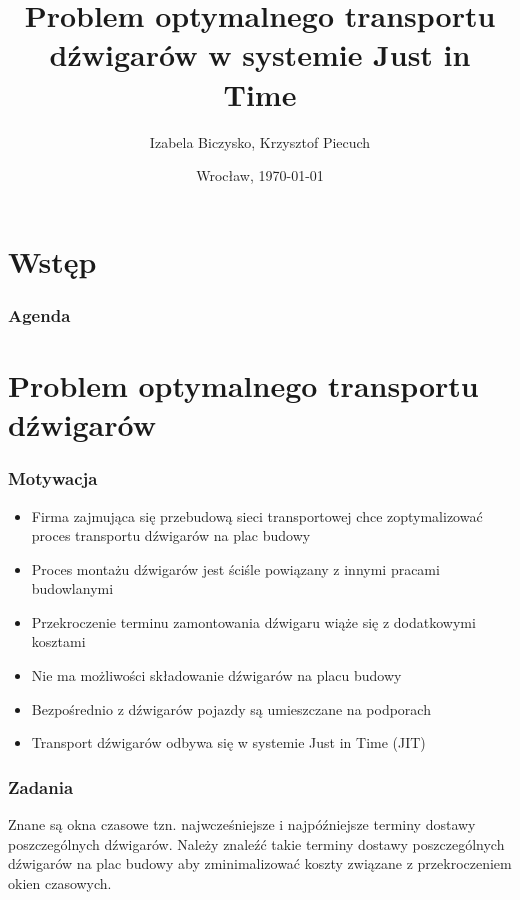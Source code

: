 \documentclass{beamer}
\title[Transport dźwigarów w systemie JIT]
{Problem optymalnego transportu dźwigarów w systemie Just in Time}
\author{Izabela Biczysko, Krzysztof Piecuch}
\institute[ii UWr]{Instytut Informatyki Uniwersytetu
Wrocławskiego}
\date{Wrocław, \today}
\begin{document}
 \maketitle



\section{Wstęp}
  \begin{frame}
  \frametitle{Agenda}
  \tableofcontents
  \end{frame}


 
 
 \section{Problem optymalnego transportu dźwigarów}
 \begin{frame}
  \frametitle{Motywacja}
  \begin{itemize}
   \item Firma zajmująca się przebudową sieci transportowej chce zoptymalizować proces transportu dźwigarów na plac budowy
   \item Proces montażu dźwigarów jest ściśle powiązany z innymi pracami budowlanymi
   \item Przekroczenie terminu zamontowania dźwigaru wiąże się z dodatkowymi kosztami
   \item Nie ma możliwości składowanie dźwigarów na placu budowy
   \item Bezpośrednio z dźwigarów pojazdy są umieszczane na podporach
   \item Transport dźwigarów odbywa się w systemie Just in Time (JIT)
  \end{itemize}

 \end{frame}
 
 \begin{frame}
  \frametitle{Zadania}
  Znane są okna czasowe tzn. najwcześniejsze i najpóźniejsze terminy dostawy poszczególnych dźwigarów. 
  Należy znaleźć takie terminy dostawy poszczególnych dźwigarów na plac budowy aby zminimalizować koszty związane z
  przekroczeniem okien czasowych.
  \end{frame}
\end{document}
